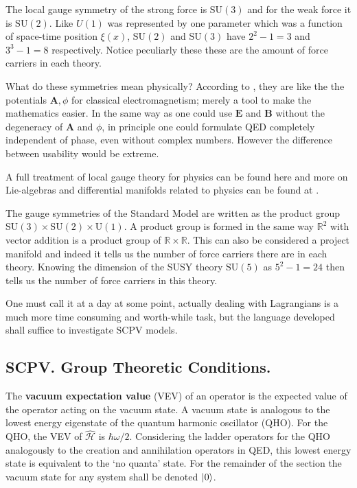 The local gauge symmetry of the strong force is $\mathrm{SU}(3)$ and for the weak force it is $\mathrm{SU}(2)$. Like $U(1)$ was represented by one parameter which was a function of space-time position $\xi(x)$, $\mathrm{SU}(2)$ and $\mathrm{SU}(3)$ have $2^2-1=3$ and $3^3-1=8$ respectively. Notice peculiarly these these are the amount of force carriers in each theory.

What do these symmetries mean physically? According to \cite{SCPV6}, they are like the the potentials $\mathbf{A}, \phi$ for classical electromagnetism; merely a tool to make the mathematics easier. In the same way as one could use $\mathbf{E}$ and $\mathbf{B}$ without the degeneracy of $\mathbf{A}$ and $\phi$, in principle one could formulate QED completely independent of phase, even without complex numbers.
However the difference between usability would be extreme.


A full treatment of local gauge theory for physics can be found here \cite{SCPV6} and more on Lie-algebras and differential manifolds related to physics can be found at \cite{SCPV3}. 

The gauge symmetries of the Standard Model are written as the product group $\mathrm{SU}(3)\times \mathrm{SU}(2)\times \mathrm{U}(1)$. A product group is formed in the same way $\mathbb{R}^2$ with vector addition is a product group of $\mathbb{R}\times\mathbb{R}$. This can also be considered a project manifold and indeed it tells us the number of force carriers there are in each theory. Knowing the dimension of the SUSY theory $\mathrm{SU}(5)$ as $5^2-1 = 24$ then tells us the number of force carriers in this theory.

One must call it at a day at some point, actually dealing with Lagrangians is a much more time consuming and worth-while task, but the language developed shall suffice to investigate SCPV models.

\subsection{SCPV. Group Theoretic Conditions.}
The \textbf{vacuum expectation value} (VEV) of an operator is the expected value of the operator acting on the vacuum state. A vacuum state is analogous to the lowest energy eigenstate of the quantum harmonic oscillator (QHO). For the QHO, the VEV of $\hat{\mathcal{H}}$ is $\hbar \omega /2$. Considering the ladder operators for the QHO analogously to the creation and annihilation operators in QED, this lowest energy state is equivalent to the `no quanta' state. For the remainder of the section the vacuum state for any system shall be denoted  $\ket{0}$.

